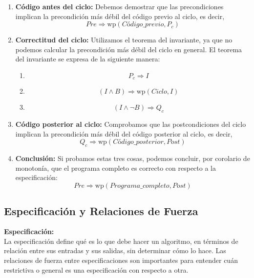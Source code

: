 \documentclass[9pt]{extarticle}  %
\begin{document}
\begin{enumerate}
    \item \textbf{Código antes del ciclo:} Debemos demostrar que las precondiciones implican la precondición más débil del código previo al ciclo, es decir,
    \[ Pre \Rightarrow \text{wp}(Código\_previo, P_c) \]
    
    \item \textbf{Correctitud del ciclo:} Utilizamos el teorema del invariante, ya que no podemos calcular la precondición más débil del ciclo en general. El teorema del invariante se expresa de la siguiente manera:
    
    \begin{enumerate}
        \item \[ P_c \Rightarrow I \]
        \item \[ (I \land B) \Rightarrow \text{wp}(Ciclo, I) \]
        \item \[ (I \land \neg B) \Rightarrow Q_c \]
    \end{enumerate}

    \item \textbf{Código posterior al ciclo:} Comprobamos que las postcondiciones del ciclo implican la precondición más débil del código posterior al ciclo, es decir,
    \[ Q_c \Rightarrow \text{wp}(Código\_posterior, Post) \]

    \item \textbf{Conclusión:} Si probamos estas tres cosas, podemos concluir, por corolario de monotonía, que el programa completo es correcto con respecto a la especificación:
    \[ Pre \Rightarrow \text{wp}(Programa\_completo, Post) \]
\end{enumerate}
    \vspace{-0.5cm}
    \vspace{-0.5cm}
\vspace{-0.6cm}

\subsection*{\tiny{Especificación y Relaciones de Fuerza}}

\noindent\textbf{Especificación:} \\
La especificación define qué es lo que debe hacer un algoritmo, en términos de relación entre sus entradas y sus salidas, sin determinar cómo lo hace. Las relaciones de fuerza entre especificaciones son importantes para entender cuán restrictiva o general es una especificación con respecto a otra.
\end{document}
